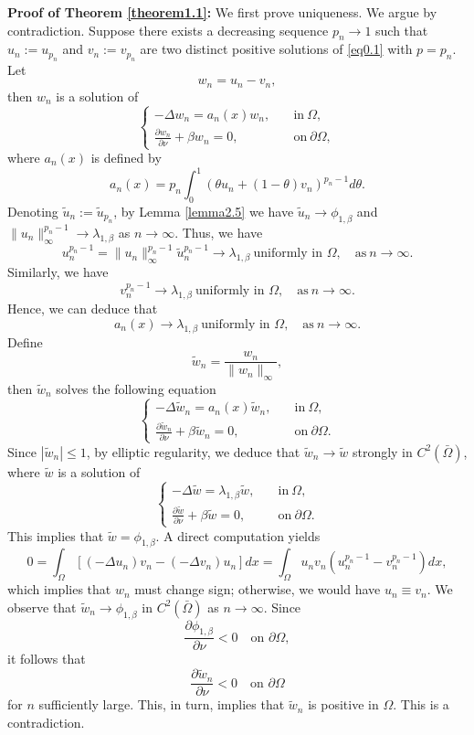 \documentclass[12pt,reqno]{amsart}
\numberwithin{equation}{section}
\theoremstyle{definition}
\begin{document}
{\bf Proof of Theorem \ref{theorem1.1}:}
We first prove uniqueness. We argue by contradiction. Suppose there exists a decreasing sequence $p_n \to 1$ such that $u_n := u_{p_n}$ and $v_n := v_{p_n}$ are two distinct positive solutions of \eqref{eq0.1} with $p=p_n$. 
Let 
$$
w_n=u_n-v_n,
$$
then $w_n$ is a solution of 
\begin{equation}
\begin{cases}
-\Delta w_n=a_n(x)w_n,\quad &\text{in}\ \Omega,\\
\frac{\partial w_n}{\partial \nu}+\beta w_n=0, &\text{on}\ \partial\Omega,
\end{cases}
\end{equation}
where $a_n(x)$ is defined by 
$$
a_n(x)=p_n\int_0^1(\theta u_n+(1-\theta)v_n )^{p_n-1}d\theta.
$$
Denoting $\tilde{u}_n := \tilde{u}_{p_n}$, by Lemma \ref{lemma2.5} we have $\tilde{u}_n \to \phi_{1,\beta}$ and $\|u_n\|_\infty^{p_n-1} \to \lambda_{1,\beta}$ as $n \to \infty$.
Thus, we have 
$$
u_n^{p_n-1}=\|u_n\|_\infty^{p_n-1}\tilde{u}_{n}^{p_n-1}\to \lambda_{1,\beta}\ \text{uniformly in } \Omega,\quad  \text{as}\ n\to\infty.
$$
Similarly, we have 
$$
v_n^{p_n-1}\to \lambda_{1,\beta}\ \text{uniformly in } \Omega,\quad \text{as}\ n\to\infty.
$$
Hence, we can deduce that 
$$
a_n(x)\to \lambda_{1,\beta}\ \text{uniformly in } \Omega, \quad \text{as}\ n\to\infty.
$$
Define 
$$
\tilde{w}_n=\frac{w_n}{\|w_n\|_\infty},
$$
then $\tilde{w}_n$ solves the following equation 
\begin{equation}
\begin{cases}
-\Delta \tilde{w}_n=a_n(x)\tilde{w}_n,\quad &\text{in}\ \Omega,\\
\frac{\partial \tilde{w}_n}{\partial \nu}+\beta\tilde{w}_n=0, &\text{on}\ \partial\Omega.
\end{cases}
\end{equation}
Since $|\tilde{w}_n|\leq 1$, by elliptic regularity, we deduce that $\tilde{w}_n \to \tilde{w}$ strongly in $C^2(\bar{\Omega})$, where $\tilde{w}$ is a solution of 
\begin{equation}
\begin{cases}
-\Delta \tilde{w}=\lambda_{1,\beta}\tilde{w},\quad &\text{in}\  \Omega,\\
\frac{\partial \tilde{w}}{\partial\nu}+\beta\tilde{w}=0, &\text{on}\ \partial\Omega.
\end{cases}
\end{equation}
This implies that $\tilde{w}=\phi_{1,\beta}$. A direct computation yields 
$$
0=\int_{\Omega}[(-\Delta u_n)v_n-(-\Delta v_n)u_n]dx=\int_{\Omega}u_nv_n(u_n^{p_n-1}-v_n^{p_n-1})dx,
$$
which implies that $w_n$ must change sign; otherwise, we would have $u_n \equiv v_n$.
We observe that  $\tilde{w}_n\to \phi_{1,\beta}$  in $C^2(\bar{\Omega})$ as $n\to\infty$. Since
\[
\frac{\partial \phi_{1,\beta}}{\partial \nu}<0
\quad\text{on }\partial\Omega,
\]
it follows that
\[
\frac{\partial \tilde{w}_n}{\partial \nu}<0
\quad\text{on }\partial\Omega
\]
for $n$ sufficiently large. This, in turn, implies that $\tilde{w}_n$ is positive in $\Omega$. This is a contradiction.
\end{document}
